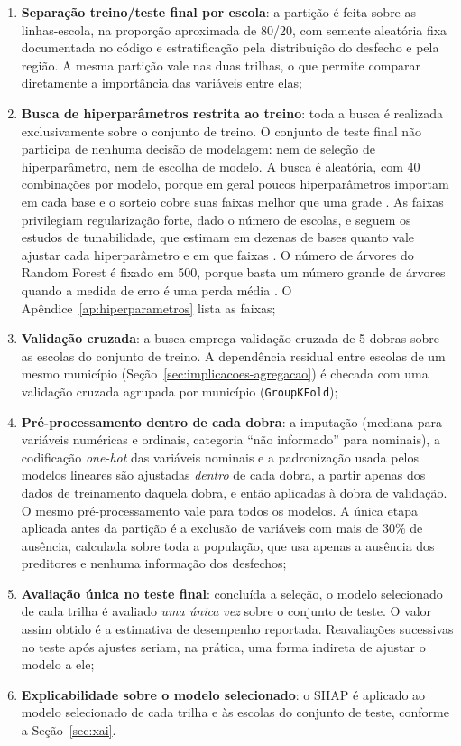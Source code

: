 \begin{enumerate}
    \item \textbf{Separação treino/teste final por escola}: a partição é
    feita sobre as linhas-escola, na proporção aproximada de 80/20, com
    semente aleatória fixa documentada no código e estratificação pela
    distribuição do desfecho e pela região. A mesma partição vale nas duas
    trilhas, o que permite comparar diretamente a importância das
    variáveis entre elas;
    \item \textbf{Busca de hiperparâmetros restrita ao treino}: toda a busca
    é realizada exclusivamente sobre o conjunto de treino. O conjunto de
    teste final não participa de nenhuma decisão de modelagem: nem de
    seleção de hiperparâmetro, nem de escolha de modelo. A busca é
    aleatória, com 40 combinações por modelo, porque em geral poucos
    hiperparâmetros importam em cada base e o sorteio cobre suas faixas
    melhor que uma grade \cite{bergstra2012random}. As faixas privilegiam
    regularização forte, dado o número de escolas, e seguem os estudos de
    tunabilidade, que estimam em dezenas de bases quanto vale ajustar cada
    hiperparâmetro e em que faixas \cite{probst2019tunability}. O número de
    árvores do Random Forest é fixado em 500, porque basta um número grande
    de árvores quando a medida de erro é uma perda média
    \cite{probst2018tune}. O Apêndice~\ref{ap:hiperparametros} lista as
    faixas;
    \item \textbf{Validação cruzada}: a busca emprega validação cruzada de
    5 dobras sobre as escolas do conjunto de treino. A dependência
    residual entre escolas de um mesmo município
    (Seção~\ref{sec:implicacoes-agregacao}) é checada com uma validação
    cruzada agrupada por município (\texttt{GroupKFold});
    \item \textbf{Pré-processamento dentro de cada dobra}: a imputação
    (mediana para variáveis numéricas e ordinais, categoria ``não
    informado'' para nominais), a codificação \textit{one-hot} das
    variáveis nominais e a padronização usada pelos modelos lineares são
    ajustadas \emph{dentro} de cada dobra, a partir apenas dos dados de
    treinamento daquela dobra, e então aplicadas à dobra de validação. O
    mesmo pré-processamento vale para todos os modelos. A única etapa
    aplicada antes da partição é a exclusão de variáveis com mais de 30\%
    de ausência, calculada sobre toda a população, que usa apenas a
    ausência dos preditores e nenhuma informação dos desfechos;
    \item \textbf{Avaliação única no teste final}: concluída a seleção, o
    modelo selecionado de cada trilha é avaliado \emph{uma única vez} sobre o
    conjunto de teste. O valor assim obtido é a estimativa de desempenho
    reportada. Reavaliações sucessivas no teste após ajustes seriam,
    na prática, uma forma indireta de ajustar o modelo a ele;
    \item \textbf{Explicabilidade sobre o modelo selecionado}: o SHAP é
    aplicado ao modelo selecionado de cada trilha e às escolas do
    conjunto de teste, conforme a Seção~\ref{sec:xai}.
\end{enumerate}


